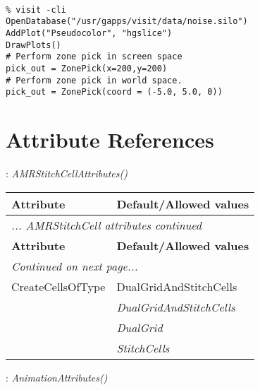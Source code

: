 \documentclass[10pt,a4paper]{report}
\begin{document}
\\[-6mm]
\begin{verbatim}% visit -cli
OpenDatabase("/usr/gapps/visit/data/noise.silo")
AddPlot("Pseudocolor", "hgslice")
DrawPlots()
# Perform zone pick in screen space
pick_out = ZonePick(x=200,y=200)
# Perform zone pick in world space.
pick_out = ZonePick(coord = (-5.0, 5.0, 0))
\end{verbatim}
\newpage

\newpage
\chapter{Attribute References}


{}
: {\it AMRStitchCellAttributes() }\\[-3mm]

\begin{longtable}{ll}
{\bf Attribute} & {\bf Default/Allowed values} \\
\hline \hline
\endfirsthead
\multicolumn{2}{l}{{\it ... AMRStitchCell attributes continued}} \\
{\bf Attribute} & {\bf Default/Allowed values} \\
\hline \hline
\endhead
\hline
\multicolumn{2}{l}{{\it Continued on next page...}} \\
\endfoot
\hline
\endlastfoot

CreateCellsOfType  &  DualGridAndStitchCells   \\
 & {\it  DualGridAndStitchCells} \\
 & {\it  DualGrid} \\
 & {\it  StitchCells} \\
\end{longtable}

\newpage

{}
: {\it AnimationAttributes() }\\[-3mm]
\end{document}
